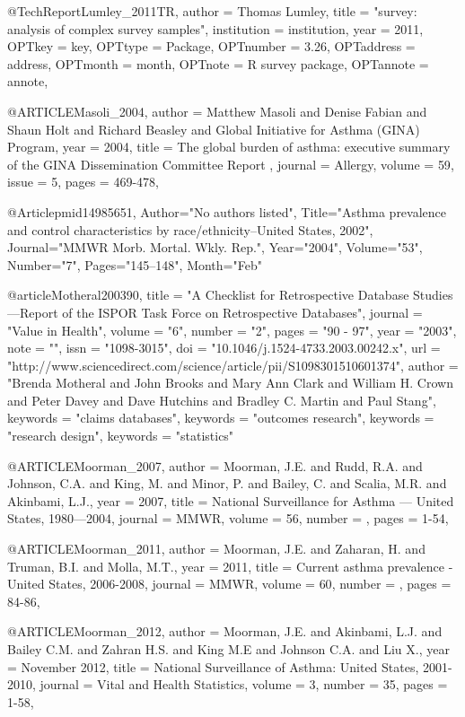 {{{@TechReport{Lumley_2011TR,
author = {Thomas Lumley},
title = {"survey: analysis of complex survey samples"},
institution = {institution},
year = {2011},
OPTkey = {key},
OPTtype = {Package},
OPTnumber = {3.26},
OPTaddress = {address},
OPTmonth = {month},
OPTnote = {R survey package},
OPTannote = {annote},
}


@ARTICLE{Masoli_2004,
  author = {Matthew Masoli and Denise Fabian and Shaun Holt and Richard Beasley and Global Initiative for Asthma (GINA) Program},
  year = {2004},
  title = {The global burden of asthma: executive summary of the GINA Dissemination Committee Report
  },
  journal = Allergy,
  volume =  {59},
  issue = {5},
  pages = {469-478},
}

@Article{pmid14985651,
   Author="No authors listed",
   Title="{{A}sthma prevalence and control characteristics by race/ethnicity--{U}nited {S}tates, 2002}",
   Journal="MMWR Morb. Mortal. Wkly. Rep.",
   Year="2004",
   Volume="53",
   Number="7",
   Pages="145--148",
   Month="Feb"
}

@article{Motheral200390,
title = "A Checklist for Retrospective Database Studies—Report of the ISPOR Task Force on Retrospective Databases",
journal = "Value in Health",
volume = "6",
number = "2",
pages = "90 - 97",
year = "2003",
note = "",
issn = "1098-3015",
doi = "10.1046/j.1524-4733.2003.00242.x",
url = "http://www.sciencedirect.com/science/article/pii/S1098301510601374",
author = "Brenda Motheral and John Brooks and Mary Ann Clark and William H. Crown and Peter Davey and Dave Hutchins and Bradley C. Martin and Paul Stang",
keywords = "claims databases",
keywords = "outcomes research",
keywords = "research design",
keywords = "statistics"
}



@ARTICLE{Moorman_2007,
  author = {Moorman, J.E. and Rudd, R.A. and Johnson, C.A. and King, M. and Minor, P. and Bailey, C. and Scalia, M.R. and Akinbami, L.J.},
  year = {2007},
  title = {National Surveillance for Asthma --- United States, 1980—2004},
  journal = MMWR,
  volume =  {56},
  number = {},
  pages = {1-54},
}


@ARTICLE{Moorman_2011,
  author = {Moorman, J.E. and Zaharan, H. and Truman, B.I. and Molla, M.T.},
  year = {2011},
  title = {Current asthma prevalence - United States, 2006-2008},
  journal = MMWR,
  volume =  {60},
  number = {},
  pages = {84-86},
}

@ARTICLE{Moorman_2012,
  author = {Moorman, J.E. and Akinbami, L.J. and Bailey C.M. and Zahran H.S. and King M.E and Johnson C.A. and Liu X.},
  year = {November 2012},
  title = {National Surveillance of Asthma: United States, 2001-2010},
  journal = Vital and Health Statistics,
  volume =  {3},
  number = {35},
  pages = {1-58},
}


}}}

